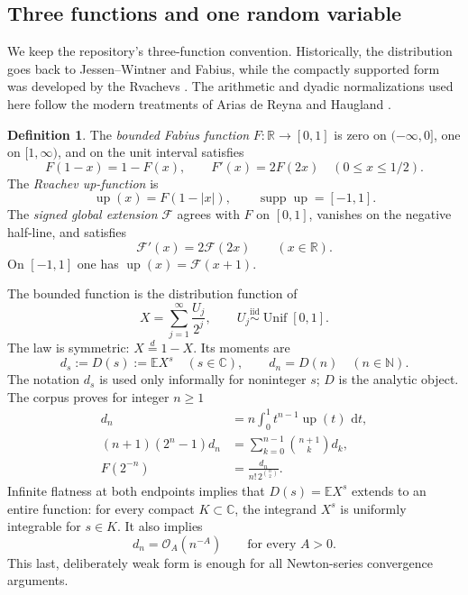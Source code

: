 \documentclass[11pt,oneside]{article}
\numberwithin{equation}{section}
\theoremstyle{definition}
\newtheorem{definition}[theorem]{Definition}
\theoremstyle{remark}
\newcommand{\R}{\mathbb R}
\newcommand{\C}{\mathbb C}
\newcommand{\N}{\mathbb N}
\newcommand{\E}{\mathbb E}
\newcommand{\Up}{\operatorname{up}}
\newcommand{\dd}{\,\mathrm d}
\newcommand{\bigO}{\mathcal O}
\newcommand{\supp}{\operatorname{supp}}
\begin{document}
\subsection{Three functions and one random variable}

We keep the repository's three-function convention.  Historically, the distribution goes
back to Jessen--Wintner and Fabius, while the compactly supported form was developed by the
Rvachevs \cite{jessen1935,fabius1966,rvachev1971,rvachev1990}.  The arithmetic and dyadic
normalizations used here follow the modern treatments of Arias de Reyna and Haugland
\cite{arias1982,arias2018,haugland2016}.

\begin{definition}
The \emph{bounded Fabius function} $F:\R\to[0,1]$ is zero on $(-\infty,0]$, one on
$[1,\infty)$, and on the unit interval satisfies
\begin{equation}
 F(1-x)=1-F(x),\qquad F'(x)=2F(2x)\quad(0\le x\le1/2).
 \label{eq:F-laws}
\end{equation}
The \emph{Rvachev up-function} is
\begin{equation}
 \Up(x)=F(1-|x|),\qquad \supp\Up=[-1,1].
 \label{eq:up-fold}
\end{equation}
The \emph{signed global extension} $\mathcal F$ agrees with $F$ on $[0,1]$, vanishes on the
negative half-line, and satisfies
\begin{equation}
 \mathcal F'(x)=2\mathcal F(2x)\qquad(x\in\R).
 \label{eq:global-diff}
\end{equation}
On $[-1,1]$ one has $\Up(x)=\mathcal F(x+1)$.
\end{definition}

The bounded function is the distribution function of
\begin{equation}
 X=\sum_{j=1}^{\infty}\frac{U_j}{2^j},
 \qquad U_j\stackrel{\mathrm{iid}}\sim\operatorname{Unif}[0,1].
 \label{eq:X-random}
\end{equation}
The law is symmetric: $X\stackrel d=1-X$.  Its moments are
\begin{equation}
 d_s:=D(s):=\E X^s \quad(s\in\C),\qquad d_n=D(n)\quad(n\in\N).
 \label{eq:D-def}
\end{equation}
The notation $d_s$ is used only informally for noninteger $s$; $D$ is the analytic object.
The corpus proves for integer $n\ge1$
\begin{align}
 d_n&=n\int_0^1t^{n-1}\Up(t)\,\dd t,                         \label{eq:d-survival}\\
 (n+1)(2^n-1)d_n&=\sum_{k=0}^{n-1}\binom{n+1}{k}d_k,          \label{eq:d-recurrence}\\
 F(2^{-n})&=\frac{d_n}{n!\,2^{\binom n2}}.                    \label{eq:F-reciprocal}
\end{align}
Infinite flatness at both endpoints implies that $D(s)=\E X^s$ extends to an entire function:
for every compact $K\subset\C$, the integrand $X^s$ is uniformly integrable for $s\in K$.
It also implies
\begin{equation}
 d_n=\bigO_A(n^{-A})\qquad\text{for every }A>0.                \label{eq:d-rapid}
\end{equation}
This last, deliberately weak form is enough for all Newton-series convergence arguments.
\end{document}
